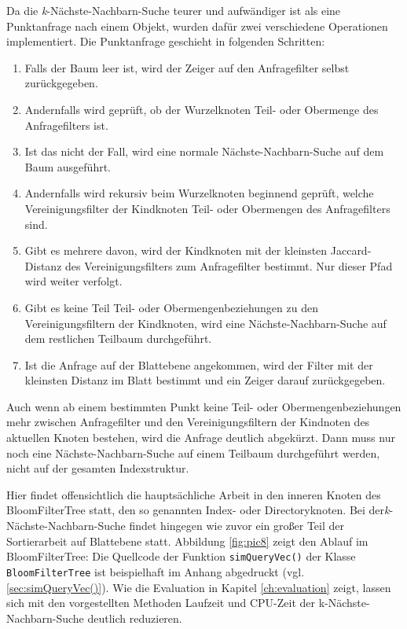 Da die \textit{k}-Nächste-Nachbarn-Suche teurer und aufwändiger ist als eine Punktanfrage nach einem Objekt, wurden dafür zwei verschiedene Operationen implementiert. Die Punktanfrage geschieht in folgenden Schritten: 
\begin{enumerate}
	\item Falls der Baum leer ist, wird der Zeiger auf den Anfragefilter selbst zurückgegeben. 
	\item Andernfalls wird geprüft, ob der Wurzelknoten Teil- oder Obermenge des Anfragefilters ist. 
	\item Ist das nicht der Fall, wird eine normale Nächste-Nachbarn-Suche auf dem Baum ausgeführt. 
	\item Andernfalls wird rekursiv beim Wurzelknoten beginnend geprüft, welche Vereinigungsfilter der Kindknoten Teil- oder Obermengen des Anfragefilters sind. 
	\item Gibt es mehrere davon, wird der Kindknoten mit der kleinsten Jaccard-Distanz des Vereinigungsfilters zum Anfragefilter bestimmt. Nur dieser Pfad wird weiter verfolgt.
	\item Gibt es keine Teil Teil- oder Obermengenbeziehungen zu den Vereinigungsfiltern der Kindknoten, wird eine Nächste-Nachbarn-Suche auf dem restlichen Teilbaum durchgeführt. 
	\item Ist die Anfrage auf der Blattebene angekommen, wird der Filter mit der kleinsten Distanz im Blatt bestimmt und ein Zeiger darauf zurückgegeben.  
\end{enumerate}
Auch wenn ab einem bestimmten Punkt keine Teil- oder Obermengenbeziehungen mehr zwischen Anfragefilter und den Vereinigungsfiltern der Kindnoten des aktuellen Knoten bestehen, wird die Anfrage deutlich abgekürzt. Dann muss nur noch eine Nächste-Nachbarn-Suche auf einem Teilbaum durchgeführt werden, nicht auf der gesamten Indexstruktur. 

Hier findet offensichtlich die hauptsächliche Arbeit in den inneren Knoten des BloomFilterTree statt, den so genannten Index- oder Directoryknoten. Bei der\textit{k}-Nächste-Nachbarn-Suche findet hingegen wie zuvor ein großer Teil der Sortierarbeit auf Blattebene statt. Abbildung \ref{fig:pic8} zeigt den Ablauf im BloomFilterTree: 
Die Quellcode der Funktion \texttt{simQueryVec()} der Klasse \texttt{BloomFilterTree} ist beispielhaft im Anhang abgedruckt (vgl. \ref{sec:simQueryVec()}). Wie die Evaluation in Kapitel \ref{ch:evaluation} zeigt, lassen sich mit den vorgestellten Methoden Laufzeit und CPU-Zeit der k-Nächste-Nachbarn-Suche deutlich reduzieren. 

